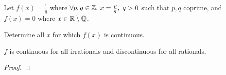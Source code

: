 \documentclass[../hw2]{subfiles}
\begin{document}
\begin{problem}[2]
Let $f(x)=\frac{1}{q}$ where $\forall p,q\in \Z.\ x=\frac{p}{q},\ q>0$ such that $p,q$ coprime, and $f(x)=0$ where $x\in \mathbb{R}\setminus\mathbb{Q}$.

Determine all $x$ for which  $f(x)$ is continuous.
\end{problem}
\begin{proposition}
	$f$ is continuous for all irrationals and discontinuous for all rationals.
\end{proposition}
\begin{proof}
\end{proof}
\end{document}
